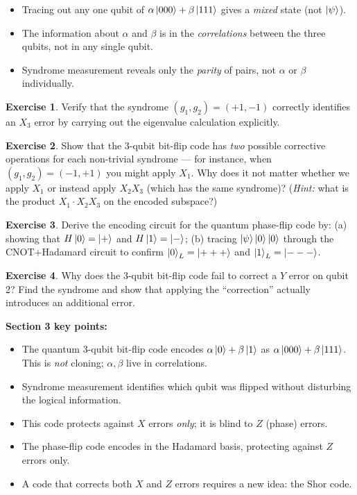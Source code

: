 \documentclass[11pt, a4paper]{article}
\theoremstyle{definition}
\newtheorem{exercise}{Exercise}[section]
\theoremstyle{plain}
\theoremstyle{remark}
\begin{document}
\begin{itemize}
  \item Tracing out any one qubit of $\alpha\ket{000}+\beta\ket{111}$ gives
        a \emph{mixed} state (not $\ket{\psi}$).
  \item The information about $\alpha$ and $\beta$ is in the
        \emph{correlations} between the three qubits, not in any single qubit.
  \item Syndrome measurement reveals only the \emph{parity} of pairs, not
        $\alpha$ or $\beta$ individually.
\end{itemize}

\begin{exercise}
Verify that the syndrome $(g_1, g_2) = (+1, -1)$ correctly identifies an
$X_3$ error by carrying out the eigenvalue calculation explicitly.
\end{exercise}

\begin{exercise}
Show that the 3-qubit bit-flip code has \emph{two} possible corrective
operations for each non-trivial syndrome --- for instance, when $(g_1,g_2)
= (-1, +1)$ you might apply $X_1$.  Why does it not matter whether we
apply $X_1$ or instead apply $X_2 X_3$ (which has the same syndrome)?
(\emph{Hint:} what is the product $X_1 \cdot X_2 X_3$ on the encoded
subspace?)
\end{exercise}

\begin{exercise}
Derive the encoding circuit for the quantum phase-flip code by:
(a) showing that $H\ket{0} = \ket{+}$ and $H\ket{1} = \ket{-}$;
(b) tracing $\ket{\psi}\ket{0}\ket{0}$ through the CNOT$+$Hadamard circuit
    to confirm $\ket{0}_L = \ket{+++}$ and $\ket{1}_L = \ket{---}$.
\end{exercise}

\begin{exercise}
Why does the 3-qubit bit-flip code fail to correct a $Y$ error on qubit 2?
Find the syndrome and show that applying the ``correction'' actually
introduces an additional error.
\end{exercise}

\begin{summarybox}
\textbf{Section 3 key points:}
\begin{itemize}
  \item The quantum 3-qubit bit-flip code encodes
        $\alpha\ket{0}+\beta\ket{1}$ as $\alpha\ket{000}+\beta\ket{111}$.
        This is \emph{not} cloning; $\alpha, \beta$ live in correlations.
  \item Syndrome measurement identifies which qubit was flipped without
        disturbing the logical information.
  \item This code protects against $X$ errors \emph{only}; it is blind to
        $Z$ (phase) errors.
  \item The phase-flip code encodes in the Hadamard basis, protecting against
        $Z$ errors only.
  \item A code that corrects both $X$ and $Z$ errors requires a new idea:
        the Shor code.
\end{itemize}
\end{summarybox}
\end{document}
